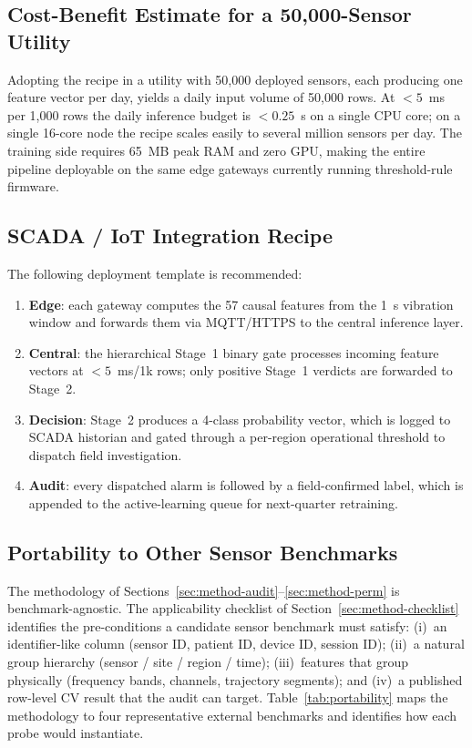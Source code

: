 \documentclass[3p,times,authoryear]{elsarticle}
\theoremstyle{remark}
\begin{document}
\subsection{Cost-Benefit Estimate for a 50{,}000-Sensor Utility}

Adopting the recipe in a utility with 50{,}000 deployed sensors,
each producing one feature vector per day, yields a daily input
volume of 50{,}000 rows. At $<5$~ms per 1{,}000 rows the daily
inference budget is $<0.25$~s on a single CPU core; on a
single 16-core node the recipe scales easily to several million
sensors per day. The training side requires 65~MB peak RAM
and zero GPU, making the entire pipeline deployable on the
same edge gateways currently running threshold-rule firmware.

\subsection{SCADA / IoT Integration Recipe}

The following deployment template is recommended:
\begin{enumerate}
\item \textbf{Edge}: each gateway computes the 57 causal
features from the 1~s vibration window and forwards them via
MQTT/HTTPS to the central inference layer.
\item \textbf{Central}: the hierarchical Stage~1 binary gate
processes incoming feature vectors at $<5$~ms/1k rows; only
positive Stage~1 verdicts are forwarded to Stage~2.
\item \textbf{Decision}: Stage~2 produces a 4-class
probability vector, which is logged to SCADA historian and
gated through a per-region operational threshold to dispatch
field investigation.
\item \textbf{Audit}: every dispatched alarm is followed by a
field-confirmed label, which is appended to the active-learning
queue for next-quarter retraining.
\end{enumerate}

\subsection{Portability to Other Sensor Benchmarks}\label{sec:engineering-portability}

The methodology of Sections~\ref{sec:method-audit}--\ref{sec:method-perm}
is benchmark-agnostic. The applicability checklist of
Section~\ref{sec:method-checklist} identifies the
pre-conditions a candidate sensor benchmark must satisfy:
(i)~an identifier-like column (sensor ID, patient ID, device ID,
session ID); (ii)~a natural group hierarchy (sensor / site /
region / time); (iii)~features that group physically
(frequency bands, channels, trajectory segments); and
(iv)~a published row-level CV result that the audit can
target. Table~\ref{tab:portability} maps the methodology to
four representative external benchmarks and identifies how
each probe would instantiate.
\end{document}
